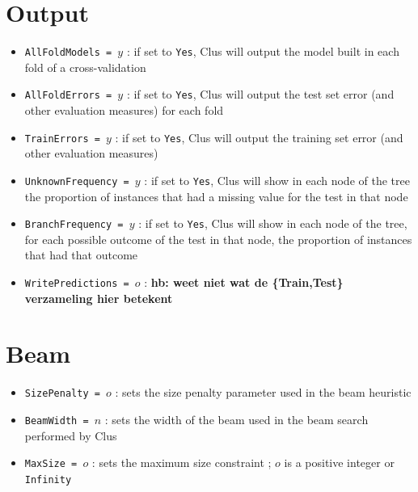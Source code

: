 \documentclass[a4paper]{report}
\begin{document}
\section{Output}

\begin{itemize}
\item {\tt AllFoldModels = $y$} : if set to {\tt Yes}, Clus will output the model built in each fold of a cross-validation
\item {\tt AllFoldErrors = $y$} : if set to {\tt Yes}, Clus will output the test set error (and other evaluation measures) for each fold
\item {\tt TrainErrors = $y$} : if set to {\tt Yes}, Clus will output the training set error (and other evaluation measures)
\item {\tt UnknownFrequency = $y$} : if set to {\tt Yes}, Clus will show in each node of the tree the proportion of instances that had a missing value for the test in that node
\item {\tt BranchFrequency = $y$} : if set to {\tt Yes}, Clus will show in each node of the tree, for each possible outcome of the test in that node, the proportion of instances that had that outcome
\item {\tt WritePredictions = $o$} : {\bf * hb: weet niet wat de \{Train,Test\} verzameling hier betekent}
\end{itemize}

\section{Beam}

\begin{itemize}
\item {\tt SizePenalty = $o$} : sets the size penalty parameter used in the beam heuristic \cite{Kocev07a:proc}
\item {\tt BeamWidth = $n$} : sets the width of the beam used in the beam search performed by Clus \cite{Kocev07a:proc}
\item {\tt MaxSize = $o$} : sets the maximum size constraint \cite{Kocev07a:proc}; $o$ is a positive integer or {\tt Infinity}
\end{itemize}
\end{document}

